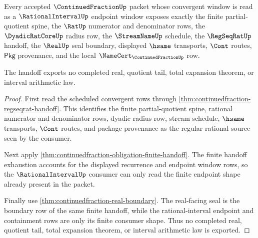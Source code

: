 \begin{theorem}
\label{thm:continuedfraction-rational-interval-window-handoff}
Every accepted $\ContinuedFractionUp$ packet whose convergent window is read as
a $\RationalIntervalUp$ endpoint window exposes exactly the finite
partial-quotient spine, the $\RatUp$ numerator and denominator rows, the
$\DyadicRatCoreUp$ radius row, the $\StreamNameUp$ schedule, the
$\RegSeqRatUp$ handoff, the $\RealUp$ seal boundary, displayed $\hsame$
transports, $\Cont$ routes, $\mathsf{Pkg}$ provenance, and the local
$\NameCert_{\ContinuedFractionUp}$ row.

The handoff exports no completed real, quotient tail, total expansion theorem,
or interval arithmetic law.
\end{theorem}
\begin{proof}
First read the scheduled convergent rows through
\autoref{thm:continuedfraction-regseqrat-handoff}. This identifies the finite
partial-quotient spine, rational numerator and denominator rows, dyadic radius
row, stream schedule, $\hsame$ transports, $\Cont$ routes, and package
provenance as the regular rational source seen by the consumer.

Next apply \autoref{thm:continuedfraction-obligation-finite-handoff}. The
finite handoff exhaustion accounts for the displayed recurrence and endpoint
window rows, so the $\RationalIntervalUp$ consumer can only read the finite
endpoint shape already present in the packet.

Finally use \autoref{thm:continuedfraction-real-boundary}. The real-facing seal
is the boundary row of the same finite handoff, while the rational-interval
endpoint and containment rows are only its finite consumer shape. Thus no
completed real, quotient tail, total expansion theorem, or interval arithmetic
law is exported.
\end{proof}

